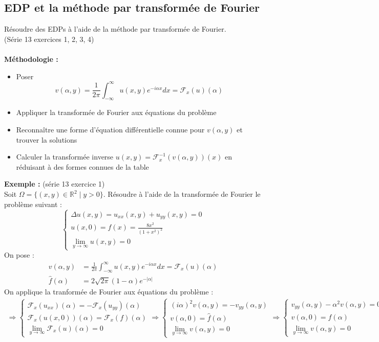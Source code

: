 \subsection{EDP et la méthode par transformée de Fourier}
Résoudre des EDPs à l’aide de la méthode par transformée de Fourier. \\
(Série 13 exercices 1, 2, 3, 4) \\
\\
\textbf{Méthodologie :}
\begin{itemize}
    \item Poser $$v(\alpha,y) = \frac{1}{2\pi} \int_{-\infty}^{\infty} u(x,y) e^{-i\alpha x}dx = \mathcal{F}_x(u)(\alpha)$$
    \item Appliquer la transformée de Fourier aux équations du problème
    \item Reconnaître une forme d'équation différentielle connue pour $v(\alpha,y)$ et trouver la solutions
    \item Calculer la transformée inverse $u(x,y) = \mathcal{F}_x^{-1}(v(\alpha,y))(x)$ en réduisant à des formes connues de la table
\end{itemize}
\textbf{Exemple :} (série 13 exercice 1) \\
Soit $\Omega = \{(x,y) \in \mathbb{R}^2 \mid y > 0\}$. Résoudre à l'aide de la transformée de Fourier le problème suivant :
$$
\begin{cases}
    \Delta u(x,y) = u_{xx}(x,y) + u_{yy}(x,y) = 0 \\
    u(x,0) = f(x) = \frac{8x^2}{(1+x^2)^2} \\
    \lim_{y \to \infty} u(x,y) = 0
\end{cases}
$$
On pose :
\begin{align*}
    v(\alpha,y) &= \frac{1}{2\pi} \int_{-\infty}^{\infty} u(x,y) e^{-i\alpha x}dx = \mathcal{F}_x(u)(\alpha) \\
    \widehat{f}(\alpha) &= 2\sqrt{2\pi} (1-\alpha) e^{-|\alpha|}
\end{align*}
On applique la tranformée de Fourier aux équations du problème :
\begin{align*}
    \Rightarrow
    \begin{cases}
        \mathcal{F}_x(u_{xx})(\alpha) = -\mathcal{F}_x(u_{yy})(\alpha) \\
        \mathcal{F}_x(u(x,0))(\alpha) = \mathcal{F}_x(f)(\alpha) \\
        \lim_{y \to \infty} \mathcal{F}_x(u)(\alpha) = 0
    \end{cases}
    \Rightarrow
    \begin{cases}
        (i\alpha)^2 v(\alpha,y) = -v_{yy}(\alpha,y) \\
        v(\alpha,0) = \widehat{f}(\alpha) \\
        \lim_{y \to \infty} v(\alpha,y) = 0
    \end{cases}
    \Rightarrow
    \begin{cases}
        v_{yy}(\alpha,y) - \alpha^2 v(\alpha,y) = 0 \tag{3} \\
        v(\alpha,0) = \widehat{f}(\alpha) \\
        \lim_{y \to \infty} v(\alpha,y) = 0
    \end{cases}
\end{align*}
